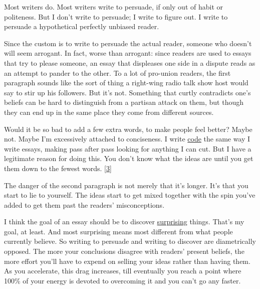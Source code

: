 Most writers do. Most writers write to
                  persuade, if only out of habit or politeness. But I don't
                  write to persuade; I write to figure out. I write to persuade
                  a hypothetical perfectly unbiased reader.

Since the
                  custom is to write to persuade the actual reader, someone who
                  doesn't will seem arrogant. In fact, worse than arrogant:
                  since readers are used to essays that try to please someone,
                  an essay that displeases one side in a dispute reads as an
                  attempt to pander to the other. To a lot of pro-union readers,
                  the first paragraph sounds like the sort of thing a right-wing
                  radio talk show host would say to stir up his followers. But
                  it's not. Something that curtly contradicts one's beliefs can
                  be hard to distinguish from a partisan attack on them, but
                  though they can end up in the same place they come from
                  different sources.

Would it be so bad to add a few
                  extra words, to make people feel better? Maybe not. Maybe I'm
                  excessively attached to conciseness. I write
                  \href{http://www.paulgraham.com/power.html}{code} the same way I write essays,
                  making pass after pass looking for anything I can cut. But I
                  have a legitimate reason for doing this. You don't know what
                  the ideas are until you get them down to the fewest words.
                  [\href{\#f3n}{3}]

The danger of the second paragraph is not merely
                  that it's longer. It's that you start to lie to yourself. The
                  ideas start to get mixed together with the spin you've added
                  to get them past the readers' misconceptions.

I
                  think the goal of an essay should be to discover
                  \href{http://www.paulgraham.com/essay.html}{surprising} things. That's my goal, at
                  least. And most surprising means most different from what
                  people currently believe. So writing to persuade and writing
                  to discover are diametrically opposed. The more your
                  conclusions disagree with readers' present beliefs, the more
                  effort you'll have to expend on selling your ideas rather than
                  having them. As you accelerate, this drag increases, till
                  eventually you reach a point where 100\% of your energy is
                  devoted to overcoming it and you can't go any faster.

